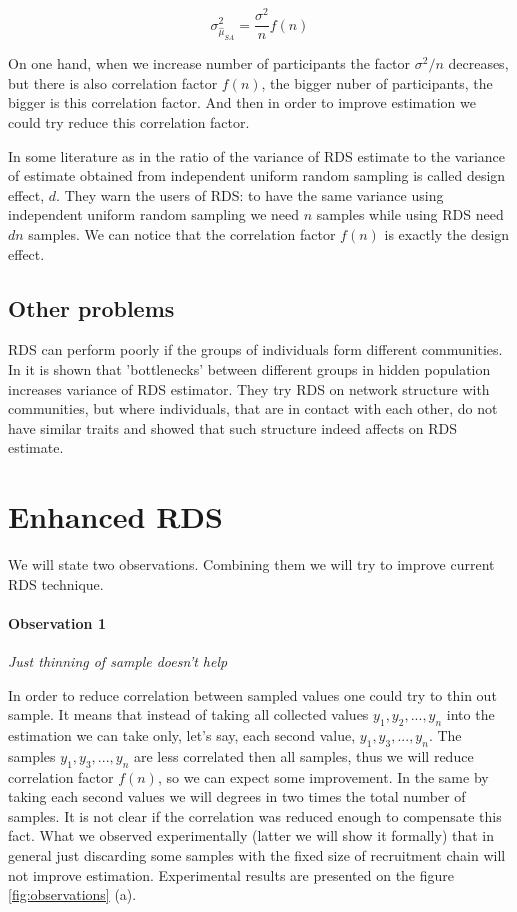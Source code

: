 \documentclass[12pt]{report}
\begin{document}
$$ \sigma^2_{\hat{\mu}_{SA}} = \frac{\sigma^2}{n} f(n)$$

On one hand, when we increase number of participants the factor $\sigma^2/n$ decreases, but there is also correlation factor $f(n)$, the bigger nuber of participants, the bigger is this correlation factor. And then in order to improve estimation we could try reduce this correlation factor.

In some literature as in  \cite{goel2010assessing} the ratio of the variance of RDS estimate to the variance of estimate obtained from independent uniform random sampling is called design effect, $d$. They warn the users of RDS: to have the same variance using independent uniform random sampling we need $n$ samples while using RDS need $dn$ samples. We can notice that the correlation factor $f(n)$ is exactly the design effect.


\subsection{Other problems}

RDS can perform poorly if the groups of individuals form different communities. In \cite{goel2009respondent} it is shown that 'bottlenecks' between different groups in hidden population increases variance of RDS estimator. They try RDS on network structure with communities, but where individuals, that are in contact with each other, do not have similar traits and showed that such structure indeed affects on RDS estimate. 


\section{Enhanced RDS}
\label{sec:Enhanced RDS}


We will state two observations. Combining them we will try to improve current RDS technique.


\paragraph{Observation 1} \textit{Just thinning of sample doesn't help}

In order to reduce correlation between sampled values one could try to thin out sample. It means that instead of taking all collected values $y_1, y_2, ..., y_n$ into the estimation we can take only, let's say, each second value, $y_1, y_3, ..., y_n$. The samples $y_1, y_3, ..., y_n$ are less correlated then all samples, thus we will reduce correlation factor $f(n)$, so we can expect some improvement. In the same by taking each second values we will degrees in two times the total number of samples. It is not clear if the correlation was reduced enough to compensate this fact. What we observed experimentally (latter we will show it formally) that in general just discarding some samples with the fixed size of recruitment chain will not improve estimation. Experimental results are presented on the figure \ref{fig:observations} (a).
\end{document}
